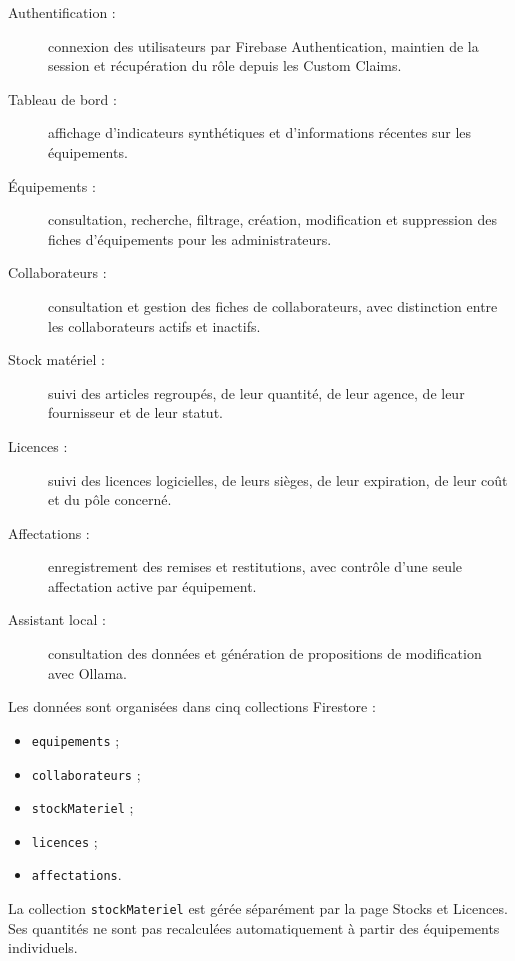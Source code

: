 \documentclass{rapportENSIAS}
\begin{document}
\begin{description}
\item[Authentification :] connexion des utilisateurs par Firebase Authentication, maintien de la session et récupération du rôle depuis les Custom Claims.

\item[Tableau de bord :] affichage d’indicateurs synthétiques et d’informations récentes sur les équipements.

\item[Équipements :] consultation, recherche, filtrage, création, modification et suppression des fiches d’équipements pour les administrateurs.

\item[Collaborateurs :] consultation et gestion des fiches de collaborateurs, avec distinction entre les collaborateurs actifs et inactifs.

\item[Stock matériel :] suivi des articles regroupés, de leur quantité, de leur agence, de leur fournisseur et de leur statut.

\item[Licences :] suivi des licences logicielles, de leurs sièges, de leur expiration, de leur coût et du pôle concerné.

\item[Affectations :] enregistrement des remises et restitutions, avec contrôle d’une seule affectation active par équipement.

\item[Assistant local :] consultation des données et génération de propositions de modification avec Ollama.
\end{description}

Les données sont organisées dans cinq collections Firestore :

\begin{itemize}
\item \texttt{equipements} ;
\item \texttt{collaborateurs} ;
\item \texttt{stockMateriel} ;
\item \texttt{licences} ;
\item \texttt{affectations}.
\end{itemize}

La collection \texttt{stockMateriel} est gérée séparément par la page Stocks et Licences. Ses quantités ne sont pas recalculées automatiquement à partir des équipements individuels.
\end{document}
